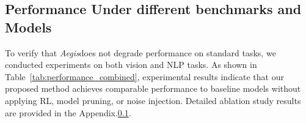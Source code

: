 \documentclass{article}
\newcommand{\method}{\textit{Aegis}}
\begin{document}
\subsection{Performance Under different benchmarks and Models}
\begin{table}[htbp]
\centering
\small
\caption{Accuracy Across NLP and Vision Model Variants and Tasks}
\label{tab:performance_combined}
\end{table}

To verify that \method does not degrade performance on standard tasks, we conducted experiments on both vision and NLP tasks. As shown in Table~\ref{tab:performance_combined}, experimental results indicate that our proposed method achieves comparable performance to baseline models without applying RL, model pruning, or noise injection. Detailed ablation study results are provided in the Appendix.\ref{}.
\end{document}
